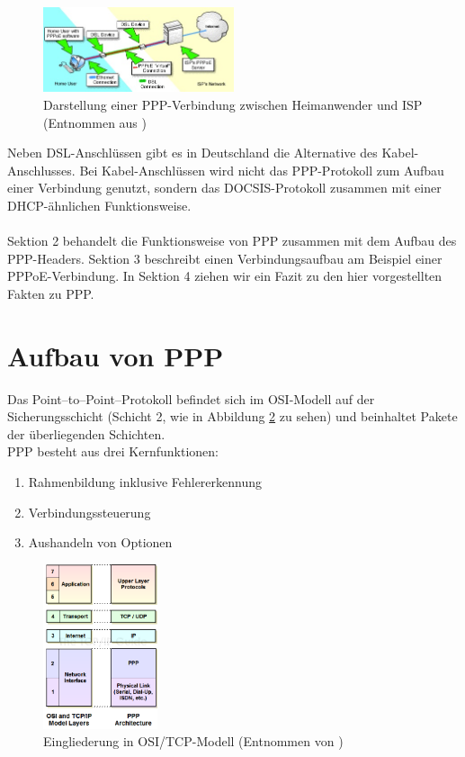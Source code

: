 \documentclass[journal,11pt]{IEEEtran}
\begin{document}
\begin{figure}[h!]
 \centering
  \includegraphics[width=0.5\textwidth]{img/PPP-Visualisierung}
 \caption{Darstellung einer PPP-Verbindung zwischen Heimanwender und ISP (Entnommen aus \cite{PPP-Bild})}
 \label{fig:PPP-Visualisierung}
\end{figure}
Neben DSL-Anschl\"ussen gibt es in Deutschland die Alternative des Kabel-Anschlusses. Bei Kabel-Anschl\"ussen wird nicht das PPP-Protokoll zum Aufbau einer Verbindung genutzt, sondern das DOCSIS-Protokoll zusammen mit einer DHCP-\"ahnlichen \cite{RFC3256} Funktionsweise. \\
\\
\newline
Sektion 2 behandelt die Funktionsweise von PPP zusammen mit dem Aufbau des PPP-Headers. Sektion 3 beschreibt einen Verbindungsaufbau am Beispiel einer PPPoE-Verbindung. In Sektion 4 ziehen wir ein Fazit zu den hier vorgestellten Fakten zu PPP.



\section{Aufbau von PPP}
Das Point--to--Point--Protokoll befindet sich im OSI-Modell auf der Sicherungsschicht (Schicht 2, wie in Abbildung \ref{fig:osi} zu sehen) und beinhaltet Pakete der überliegenden Schichten.\\
PPP besteht aus drei Kernfunktionen:

\begin{enumerate}
    \item Rahmenbildung inklusive Fehlererkennung
    \item Verbindungssteuerung
    \item Aushandeln von Optionen
\end{enumerate}

\begin{figure}[h!]
 \centering
  \includegraphics[width=0.3\textwidth]{img/ppplayers}
 \caption{Eingliederung in OSI/TCP-Modell (Entnommen von \cite{ppposi})}
 \label{fig:osi}
\end{figure}
\end{document}
